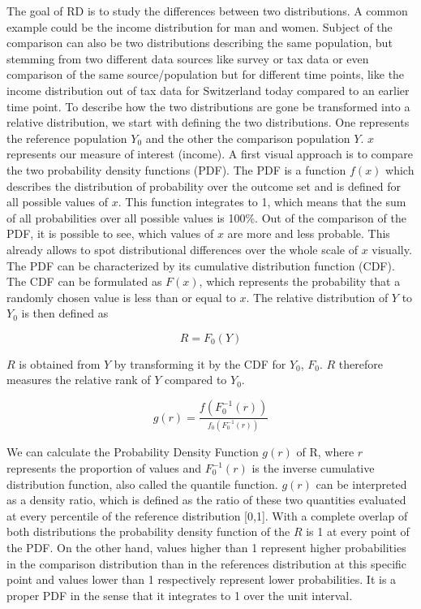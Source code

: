 \documentclass[twoside]{article}\usepackage[]{graphicx}\usepackage[]{color}
\begin{document}
\begin{multicols}{2}
The goal of RD is to study the differences between two distributions. A common example could be the income distribution for man and women. Subject of the comparison can also be two distributions describing the same population, but stemming from two different data sources like survey or tax data or even comparison of the same source/population but for different time points, like the income distribution out of tax data for Switzerland today compared to an earlier time point. To describe how the two distributions are gone be transformed into a relative distribution, we start with defining the two distributions. One represents the reference population $Y_{0}$ and the other the comparison population $Y$. $x$ represents our measure of interest (income). A first visual approach is to compare the two probability density functions (PDF). The PDF is a function $f(x)$ which describes the distribution of probability over the outcome set and is defined for all possible values of $x$. This function integrates to 1, which means that the sum of all probabilities over all possible values is 100\%. Out of the comparison of the PDF, it is possible to see, which values of $x$ are more and less probable. This already allows to spot distributional differences over the whole scale of $x$ visually. \\

The PDF can be characterized by its cumulative distribution function (CDF). The CDF can be formulated as $F(x)$, which represents the probability that a randomly chosen value is less than or equal to $x$. The relative distribution of $Y$ to $Y_{0}$ is then defined as 

\begin{equation}
R=F_{0}(Y)
\end{equation}

$R$ is obtained from $Y$ by transforming it by the CDF for $Y_{0}$, $F_{0}$. $R$ therefore measures the relative rank of $Y$ compared to $Y_{0}$. 



\begin{equation}
g(r)=\frac{f(F_{0}^{-1}(r))}{^{f_{0}(F_{0}^{-1}(r))}}
\end{equation}


We can calculate the Probability Density Function $g(r)$ of R, where $r$ represents the proportion of values and $F_{0}^{-1}(r)$ is the inverse cumulative distribution function, also called the quantile function. $g(r)$ can be interpreted as a density ratio, which is defined as the ratio of these two quantities evaluated at every percentile of the reference distribution [0,1]. With a complete overlap of both distributions the probability density function of the $R$ is 1 at every point of the PDF. On the other hand, values higher than 1 represent higher probabilities in the comparison distribution than in the references distribution at this specific point and values lower than 1 respectively represent lower probabilities. It is a proper PDF in the sense that it integrates to 1 over the unit interval.\\


\end{multicols}
\end{document}
